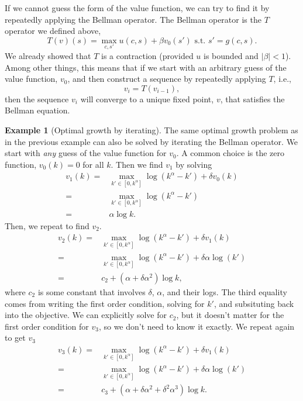 \documentclass[12pt,reqno]{amsart}
\theoremstyle{definition}
\newtheorem{example}{Example}[section]
\newcommand{\abs}[1]{\left\vert {#1} \right\vert}
\begin{document}
If we cannot guess the form of the value function, we can try to find
it by repeatedly applying the Bellman operator. The Bellman operator
is the $T$ operator we defined above,
\[ T(v)(s) = \max_{c,s'} u(c,s) + \beta v_0(s') \text{ s.t. } s'=g(c,s). \]
We already showed that $T$ is a contraction (provided $u$ is bounded
and $\abs{\beta} < 1$). Among other things, this means that if we
start with an arbitrary guess of the value function, $v_0$, and then
construct a sequence by repeatedly applying $T$, i.e., 
\[ v_i = T(v_{i-1}), \]
then the sequence $v_i$ will converge to a unique fixed point, $v$,
that satisfies the Bellman equation. 
\begin{example}[Optimal growth by iterating]
  The same optimal growth problem as in the previous example can also
  be solved by iterating the Bellman operator. We start with
  \emph{any} guess of the value function for $v_0$. A common choice is
  the zero function, $v_0(k) = 0$ for all $k$. Then we find $v_1$ by
  solving 
  \begin{align*}
    v_1(k) = & \max_{k' \in [0,k^\alpha]} \log(k^\alpha - k') + \delta v_0(k)
    \\
    = & \max_{k' \in [0,k^\alpha]} \log(k^\alpha - k') \\
    = & \alpha \log k.
  \end{align*}
  Then, we repeat to find $v_2$.
  \begin{align*}
    v_2(k) = & \max_{k' \in [0,k^\alpha]} \log(k^\alpha - k') + \delta v_1(k)
    \\
    = & \max_{k' \in [0,k^\alpha]} \log(k^\alpha - k') + \delta
    \alpha \log(k')  \\
    = & c_2 + (\alpha + \delta \alpha^2) \log k,
  \end{align*}
  where $c_2$ is some constant that involves $\delta$, $\alpha$, and
  their logs. The third equality comes from writing the first order
  condition, solving for $k'$, and subsituting back into the
  objective.  We can explicitly solve for $c_2$, but it doesn't matter
  for the first order condition for $v_3$, so we don't need to know it
  exactly. We repeat again to get $v_3$
  \begin{align*}
    v_3(k) = & \max_{k' \in [0,k^\alpha]} \log(k^\alpha - k') + \delta v_1(k)
    \\
    = & \max_{k' \in [0,k^\alpha]} \log(k^\alpha - k') + \delta
    \alpha \log(k')  \\
    = & c_3 + (\alpha + \delta \alpha^2 + \delta^2 \alpha^3) \log k.
  \end{align*}    

\end{example}
\end{document}
